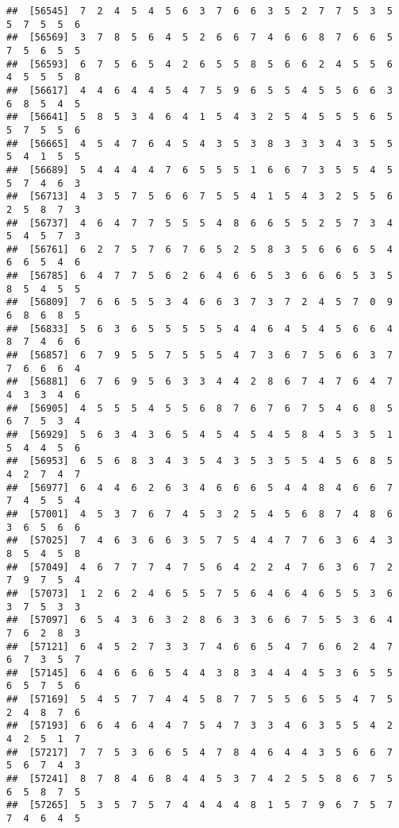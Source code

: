 \documentclass[
]{book}
\begin{document}
\begin{verbatim}
##  [56545]  7  2  4  5  4  5  6  3  7  6  6  3  5  2  7  7  5  3  5  5  7  5  5  6
##  [56569]  3  7  8  5  6  4  5  2  6  6  7  4  6  6  8  7  6  6  5  7  5  6  5  5
##  [56593]  6  7  5  6  5  4  2  6  5  5  8  5  6  6  2  4  5  5  6  4  5  5  5  8
##  [56617]  4  4  6  4  4  5  4  7  5  9  6  5  5  4  5  5  6  6  3  6  8  5  4  5
##  [56641]  5  8  5  3  4  6  4  1  5  4  3  2  5  4  5  5  5  6  5  5  7  5  5  6
##  [56665]  4  5  4  7  6  4  5  4  3  5  3  8  3  3  3  4  3  5  5  5  4  1  5  5
##  [56689]  5  4  4  4  4  7  6  5  5  5  1  6  6  7  3  5  5  4  5  5  7  4  6  3
##  [56713]  4  3  5  7  5  6  6  7  5  5  4  1  5  4  3  2  5  5  6  2  5  8  7  3
##  [56737]  4  6  4  7  7  5  5  5  4  8  6  6  5  5  2  5  7  3  4  5  4  5  7  3
##  [56761]  6  2  7  5  7  6  7  6  5  2  5  8  3  5  6  6  6  5  4  6  6  5  4  6
##  [56785]  6  4  7  7  5  6  2  6  4  6  6  5  3  6  6  6  5  3  5  8  5  4  5  5
##  [56809]  7  6  6  5  5  3  4  6  6  3  7  3  7  2  4  5  7  0  9  6  8  6  8  5
##  [56833]  5  6  3  6  5  5  5  5  5  4  4  6  4  5  4  5  6  6  4  8  7  4  6  6
##  [56857]  6  7  9  5  5  7  5  5  5  4  7  3  6  7  5  6  6  3  7  7  6  6  6  4
##  [56881]  6  7  6  9  5  6  3  3  4  4  2  8  6  7  4  7  6  4  7  4  3  3  4  6
##  [56905]  4  5  5  5  4  5  5  6  8  7  6  7  6  7  5  4  6  8  5  6  7  5  3  4
##  [56929]  5  6  3  4  3  6  5  4  5  4  5  4  5  8  4  5  3  5  1  5  4  4  5  6
##  [56953]  6  5  6  8  3  4  3  5  4  3  5  3  5  5  4  5  6  8  5  4  2  7  4  7
##  [56977]  6  4  4  6  2  6  3  4  6  6  6  5  4  4  8  4  6  6  7  7  4  5  5  4
##  [57001]  4  5  3  7  6  7  4  5  3  2  5  4  5  6  8  7  4  8  6  3  6  5  6  6
##  [57025]  7  4  6  3  6  6  3  5  7  5  4  4  7  7  6  3  6  4  3  8  5  4  5  8
##  [57049]  4  6  7  7  7  4  7  5  6  4  2  2  4  7  6  3  6  7  2  7  9  7  5  4
##  [57073]  1  2  6  2  4  6  5  5  7  5  6  4  6  4  6  5  5  3  6  3  7  5  3  3
##  [57097]  6  5  4  3  6  3  2  8  6  3  3  6  6  7  5  5  3  6  4  7  6  2  8  3
##  [57121]  6  4  5  2  7  3  3  7  4  6  6  5  4  7  6  6  2  4  7  6  7  3  5  7
##  [57145]  6  4  6  6  6  5  4  4  3  8  3  4  4  4  5  3  6  5  5  6  5  7  5  6
##  [57169]  5  4  5  7  7  4  4  5  8  7  7  5  5  6  5  5  4  7  5  2  4  8  7  6
##  [57193]  6  6  4  6  4  4  7  5  4  7  3  3  4  6  3  5  5  4  2  4  2  5  1  7
##  [57217]  7  7  5  3  6  6  5  4  7  8  4  6  4  4  3  5  6  6  7  5  6  7  4  3
##  [57241]  8  7  8  4  6  8  4  4  5  3  7  4  2  5  5  8  6  7  5  6  5  8  7  5
##  [57265]  5  3  5  7  5  7  4  4  4  4  8  1  5  7  9  6  7  5  7  7  4  6  4  5

\end{verbatim}
\end{document}
